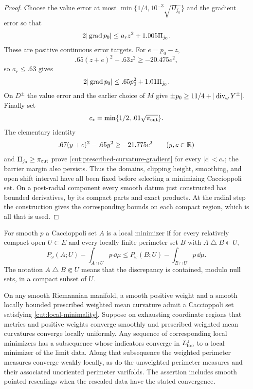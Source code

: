 \begin{proof}
Choose the value error at most
$\min\{1/4,10^{-3}\sqrt{\Pi_{j_0}}\}$ and the gradient error so that
\[
 2|\operatorname{grad} p_0|\le a_rz^2+1.005\Pi_{j_0}.
\]
These are positive continuous error targets.  For $e=p_0-z$,
\[
 .65(z+e)^2-.63z^2\ge-20.475e^2,
\]
so $a_r\le .63$ gives
\[
             2|\operatorname{grad} p_0|\le .65p_0^2+1.01\Pi_{j_0}.
\]
On $D^\pm$ the value error and the earlier choice of $M$ give
$\pm p_0\ge 11/4+|\operatorname{div}_\omega Y^\pm|$.  Finally set
\[
           c_* =\min\{1/2,.01\sqrt{\pi_{\rm cut}}\}.
\]
The elementary identity
\[
 .67(y+c)^2-.65y^2\ge-21.775c^2\qquad(y,c\in\mathbb R)
\]
and $\Pi_{j_0}\ge\pi_{\rm cut}$ prove
\eqref{cut:prescribed-curvature-gradient} for every $|c|<c_*$; the barrier margin
also persists.  Thus the domains, clipping height, smoothing, and open
shift interval have all been fixed before selecting a minimizing Caccioppoli set.
On a post-radial component every smooth datum just constructed has bounded
derivatives, by its compact parts and exact products.  At the radial
step the construction gives the corresponding bounds on each compact
region, which is all that is used.
\end{proof}

\begin{definition}\label{cut:minimizer-definition}
For smooth $p$ a Caccioppoli set $A$ is a local minimizer if for every
relatively compact open $U\subset E$ and every locally finite-perimeter
set $B$ with $A\mathbin\triangle B\Subset U$,
\begin{equation}\label{cut:local-minimality}
 P_\omega(A;U)-\int_{A\cap U}p\,\dd\mu
 \le P_\omega(B;U)-\int_{B\cap U}p\,\dd\mu.
\end{equation}
The notation $A\mathbin\triangle B\Subset U$ means that the discrepancy
is contained, modulo null sets, in a compact subset of $U$.
\end{definition}

\begin{lemma}\label{cut:bv-compactness}
On any smooth Riemannian manifold, a smooth positive weight and a
smooth locally bounded prescribed weighted mean curvature admit a Caccioppoli set satisfying
\eqref{cut:local-minimality}.  Suppose on exhausting
coordinate regions that metrics and positive weights converge smoothly
and prescribed weighted mean curvatures converge locally uniformly.  Any sequence of corresponding
local minimizers has a subsequence whose indicators converge in
$L^1_{\rm loc}$ to a local minimizer of the limit data.  Along
that subsequence the weighted perimeter measures converge weakly locally,
as do the unweighted perimeter measures and their associated unoriented
perimeter varifolds.  The assertion includes smooth pointed rescalings
when the rescaled data have the stated convergence.
\end{lemma}

